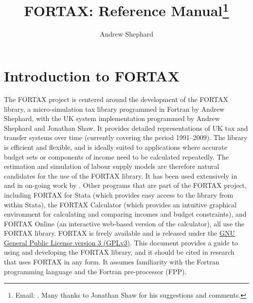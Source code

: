 \documentclass[11pt,thmsa,letter,ukenglish]{article}
\title{FORTAX: Reference Manual\thanks{Email: \texttt{\mailto{andrubuntu@gmail.com}}. 
Many thanks to Jonathan Shaw for his suggestions and comments.}}
\author{Andrew Shephard}
\begin{document}
\maketitle

\tableofcontents

\section{Introduction to FORTAX}

The FORTAX project is centered around the development of the FORTAX library, a micro-simulation tax library programmed in Fortran by Andrew Shephard, with the UK system implementation programmed by Andrew Shephard and Jonathan Shaw. It provides detailed representations of UK tax and transfer systems over time (currently covering the period 1991--2009). The library is efficient and flexible, and is ideally suited to applications where accurate budget sets or components of income need to be calculated repeatedly. The estimation and simulation of labour supply models are therefore natural candidates for the use of the  FORTAX library. It has been used extensively in \cite{blundell+shephard2009} and in on-going work by \cite{blundell+costadias+meghir+shaw2009}. Other programs that are part of the FORTAX project, including FORTAX for Stata (which provides easy access to the library from within Stata), the FORTAX Calculator (which provides an intuitive graphical environment for calculating and comparing incomes and budget constraints), and FORTAX Online (an interactive web-based version of the calculator), all use the FORTAX library. FORTAX is freely available and is released under the \href{http://www.gnu.org/licenses/gpl.html}{GNU General Public License version 3 (GPLv3)}. This document provides a guide to using and developing the FORTAX library, and it should be cited in research that uses FORTAX in any form. It assumes familiarity with the Fortran programming language and the Fortran pre-processor (FPP). 

\end{document}
